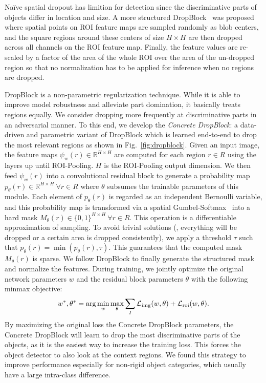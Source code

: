 \documentclass[10pt,twocolumn,letterpaper]{article}
\begin{document}
Na\"ive spatial dropout has limition for detection since the discriminative parts of objects differ in location and size. A more structured DropBlock~\cite{dropblock} was proposed where spatial points on ROI feature maps are sampled randomly as blob centers, and the square regions around these centers of size $H\times H$ are then dropped across all channels on the ROI feature map. Finally, the feature values are re-scaled by a factor of the area of the whole ROI over the area of the un-dropped region so that no normalization has to be applied for inference when no regions are dropped. 

DropBlock is a non-parametric regularization technique. While it is able to improve model robustness and alleviate part domination, it basically treats regions equally. We consider dropping more frequently at discriminative parts in an adversarial manner. To this end, we develop the \textit{Concrete DropBlock}: a data-driven and parametric variant of DropBlock which is learned end-to-end to drop the most relevant regions as shown in Fig.~\ref{fig:dropblock}. Given an input image, the feature maps $\psi_w(r)\in\mathbb{R}^{H\times H}$ are computed for each region $r \in R$ using the layers up until ROI-Pooling. $H$ is the ROI-Pooling output dimension. We then feed $\psi_w(r)$ into a convolutional residual block to generate a probability map $p_\theta(r)\in\mathbb{R}^{H\times H}~\forall r \in R$ where $\theta$ subsumes the trainable parameters of this module. Each element of $p_\theta(r)$ is regarded as an independent Bernoulli variable, and this probability map is transformed via a spatial Gumbel-Softmax~\cite{Gumbel-Softmax,concrete} into a hard mask $M_\theta(r) \in \{0,1\}^{H\times H}~\forall r \in R$. This operation is a differentiable approximation of  sampling. To avoid trivial solutions (\eg, everything will be dropped or a certain area is dropped consistently), we apply a threshold $\tau$ such that $p_\theta(r) = \min (p_\theta(r), \tau)$. This  guarantees that the computed mask $M_\theta(r)$ is sparse. We follow DropBlock to finally generate the structured mask and normalize the features. During training, we jointly optimize the original network parameters $w$ and the residual block parameters $\theta$ with the following minmax objective:
\begin{equation}
\small{
w^*, \theta^* = \arg \min_w \max_\theta \sum_{I} \mathcal{L}_\text{img} (w, \theta) +  \mathcal{L}_\text{roi} (w, \theta). 
}
\end{equation}
By maximizing the original loss \wrt the Concrete DropBlock parameters, the Concrete DropBlock will learn to drop the most discriminative parts of the objects, as it is  the easiest way to increase the training loss. This forces the object detector  to also look at the context regions. We found this strategy to improve performance especially for  non-rigid object categories, which usually have a large intra-class difference.
\end{document}
